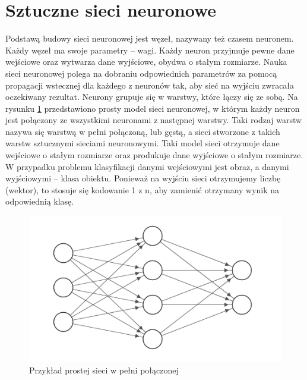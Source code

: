 \documentclass[a4paper,twoside,12pt]{book}
\begin{document}
\section{Sztuczne sieci neuronowe}
{Podstawą budowy sieci neuronowej jest węzeł\cite{bishop1995neural}, nazywany też czasem neuronem. Każdy węzeł ma swoje parametry – wagi. Każdy neuron przyjmuje pewne dane wejściowe oraz wytwarza dane wyjściowe, obydwa o stałym rozmiarze. Nauka sieci neuronowej polega na dobraniu odpowiednich parametrów za pomocą propagacji wstecznej dla każdego z neuronów tak, aby sieć na wyjściu zwracała oczekiwany rezultat\cite{8118}. Neurony grupuje się w warstwy, które łączy się ze sobą. Na rysunku \ref{simplenetwork} przedstawiono prosty model sieci neuronowej, w którym każdy neuron jest połączony ze wszystkimi neuronami z następnej warstwy. Taki rodzaj warstw nazywa się warstwą w pełni połączoną, lub gęstą, a sieci stworzone z takich warstw sztucznymi sieciami neuronowymi. Taki model sieci otrzymuje dane wejściowe o stałym rozmiarze oraz produkuje dane wyjściowe o stałym rozmiarze. W przypadku problemu klasyfikacji danymi wejściowymi jest obraz, a danymi wyjściowymi – klasa obiektu. Ponieważ na wyjściu sieci otrzymujemy liczbę (wektor), to stosuje się kodowanie 1 z n, aby zamienić otrzymany wynik na odpowiednią klasę.

\begin{figure}[h!]


\centering
\includegraphics[scale=0.75]{connected.png}
\caption{Przykład prostej sieci w pełni połączonej}
\label{simplenetwork}
\end{figure}




}
\end{document}
